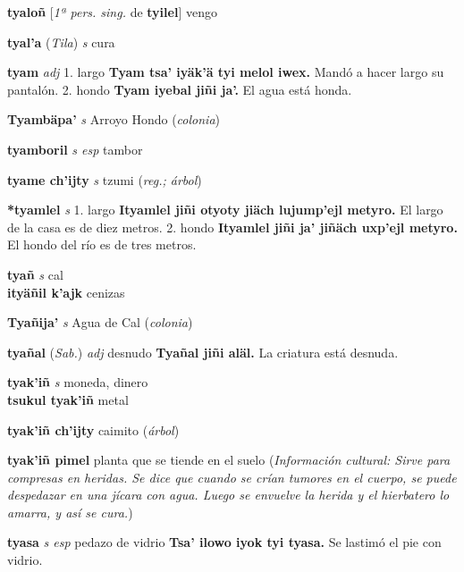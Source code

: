 \documentclass[10pt]{scrbook}
\newcommand{\entry}[1]{\textbf{#1}}
\newcommand{\onedefinition}[1]{#1.}
\newcommand{\partofspeech}[1]{\textit{#1}}
\newcommand{\spanishtranslation}[1]{#1}
\newcommand{\clarification}[1]{(\textit{#1})}
\newcommand{\cholexample}[1]{\textbf{#1}}
\newcommand{\exampletranslation}[1]{#1}
\newcommand{\relevantdialect}[1]{(\textit{#1})}
\newcommand{\culturalinformation}[1]{(\textit{#1})}
\newcommand{\secondaryentry}[1]{\\\textbf{#1}}
\newcommand{\secondtranslation}[1]{#1}
\newcommand{\conjugationtense}[1]{[\textit{#1}}
\newcommand{\conjugationverb}[1]{de \textbf{#1}]}
\begin{document}
\begin{multicols}{2}
\entry{tyaloñ}
\conjugationtense{1ª pers. sing.}
\conjugationverb{tyilel}
\spanishtranslation{vengo}

\entry{tyal'a}
\relevantdialect{Tila}
\partofspeech{s}
\spanishtranslation{cura}

\entry{tyam}
\partofspeech{adj}
\onedefinition{1}
\spanishtranslation{largo}
\cholexample{Tyam tsa' iyäk'ä tyi melol iwex.}
\exampletranslation{Mandó a hacer largo su pantalón.}
\onedefinition{2}
\spanishtranslation{hondo}
\cholexample{Tyam iyebal jiñi ja'.}
\exampletranslation{El agua está honda.}

\entry{Tyambäpa'}
\partofspeech{s}
\spanishtranslation{Arroyo Hondo}
\clarification{colonia}

\entry{tyamboril}
\partofspeech{s esp}
\spanishtranslation{tambor}

\entry{tyame ch'ijty}
\partofspeech{s}
\spanishtranslation{tzumi}
\clarification{reg.; árbol}

\entry{*tyamlel}
\partofspeech{s}
\onedefinition{1}
\spanishtranslation{largo}
\cholexample{Ityamlel jiñi otyoty jiäch lujump'ejl metyro.}
\exampletranslation{El largo de la casa es de diez metros.}
\onedefinition{2}
\spanishtranslation{hondo}
\cholexample{Ityamlel jiñi ja' jiñäch uxp'ejl metyro.}
\exampletranslation{El hondo del río es de tres metros.}

\entry{tyañ}
\partofspeech{s}
\spanishtranslation{cal}
\secondaryentry{ityäñil k'ajk}
\secondtranslation{cenizas}

\entry{Tyañija'}
\partofspeech{s}
\spanishtranslation{Agua de Cal}
\clarification{colonia}

\entry{tyañal}
\relevantdialect{Sab.}
\partofspeech{adj}
\spanishtranslation{desnudo}
\cholexample{Tyañal jiñi aläl.}
\exampletranslation{La criatura está desnuda.}

\entry{tyak'iñ}
\partofspeech{s}
\spanishtranslation{moneda, dinero}
\secondaryentry{tsukul tyak'iñ}
\secondtranslation{metal}

\entry{tyak'iñ ch'ijty}
\spanishtranslation{caimito}
\clarification{árbol}

\entry{tyak'iñ pimel}
\spanishtranslation{planta que se tiende en el suelo}
\culturalinformation{Información cultural: Sirve para compresas en heridas. Se dice que cuando se crían tumores en el cuerpo, se puede despedazar en una jícara con agua. Luego se envuelve la herida y el hierbatero lo amarra, y así se cura.}

\entry{tyasa}
\partofspeech{s esp}
\spanishtranslation{pedazo de vidrio}
\cholexample{Tsa' ilowo iyok tyi tyasa.}
\exampletranslation{Se lastimó el pie con vidrio.}


\end{multicols}
\end{document}
